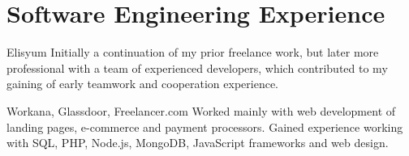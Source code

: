 \section{Software Engineering Experience}

\begin{experience}{Elisyum}{
}
Initially a continuation of my prior freelance work, but later more professional with a team of experienced developers, which contributed to my gaining of early teamwork and cooperation experience.

\end{experience}
\begin{experience}[last]{Workana, Glassdoor, Freelancer.com}{
}
Worked mainly with web development of landing pages, e-commerce and payment processors. Gained experience working with SQL, PHP, Node.js, MongoDB, JavaScript frameworks
 and web design.

\end{experience}

